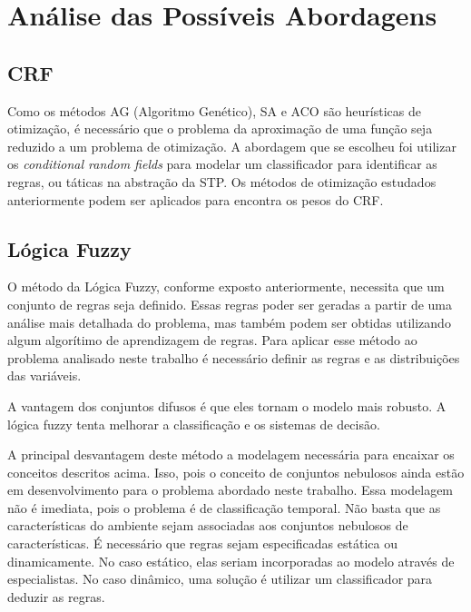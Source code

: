 \chapter{Análise das Possíveis Abordagens}\label{cap:anal_abordagens}


\section{CRF}

Como os métodos AG (Algoritmo Genético), SA e ACO são heurísticas de otimização,
é necessário que o problema da aproximação de uma função seja reduzido a um problema
de otimização. A abordagem que se escolheu foi utilizar os \textit{conditional random
fields} para modelar um classificador para identificar as regras, ou táticas na
abstração da STP\@. Os métodos de otimização estudados anteriormente podem ser
aplicados para encontra os pesos do CRF.

\section{Lógica Fuzzy}

O método da Lógica Fuzzy, conforme exposto anteriormente, necessita que um conjunto
de regras seja definido. Essas regras poder ser geradas a partir de uma análise mais
detalhada do problema, mas também podem ser obtidas utilizando algum algorítimo de
aprendizagem de regras. Para aplicar esse método ao problema analisado neste trabalho
é necessário definir as regras e as distribuições das variáveis.

A vantagem dos conjuntos difusos é que eles tornam o modelo mais robusto. A lógica fuzzy
tenta melhorar a classificação e os sistemas de decisão.

A principal desvantagem deste método a modelagem necessária para encaixar os conceitos
descritos acima. Isso, pois o conceito de conjuntos nebulosos ainda estão em desenvolvimento
para o problema abordado neste trabalho. Essa modelagem não é imediata, pois o problema é de
classificação temporal. Não basta que as características do ambiente sejam associadas aos
conjuntos nebulosos de características. É necessário que regras sejam especificadas estática
ou dinamicamente. No caso estático, elas seriam incorporadas ao modelo através de especialistas.
No caso dinâmico, uma solução é utilizar um classificador para deduzir as regras.


